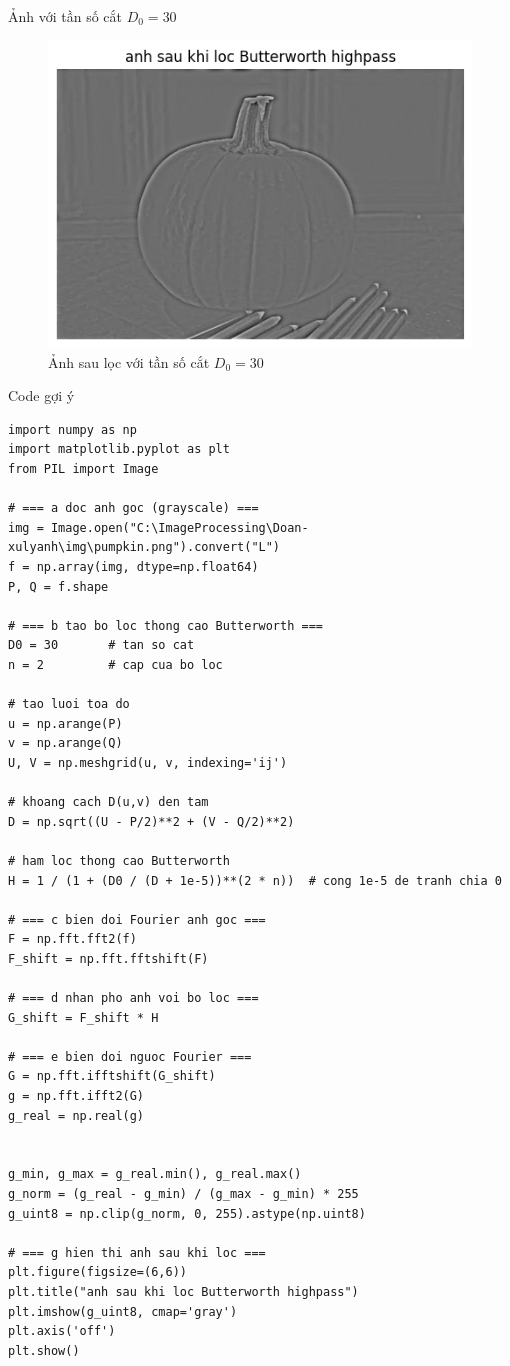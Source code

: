 \documentclass[12pt,a4paper]{report}
\numberwithin{equation}{section}
\theoremstyle{definition} %
\begin{document}
Ảnh với tần số cắt $D_0=30$
\begin{figure}[H]
\centering
\includegraphics[width=0.7\linewidth]{img/butterworthhighpass/anhsaulocHighpass.png}
\caption{Ảnh sau lọc với tần số cắt $D_0=30$}
\label{fig137}
\end{figure}
Code gợi ý
\begin{lstlisting}
import numpy as np
import matplotlib.pyplot as plt
from PIL import Image

# === a doc anh goc (grayscale) ===
img = Image.open("C:\ImageProcessing\Doan-xulyanh\img\pumpkin.png").convert("L")
f = np.array(img, dtype=np.float64)
P, Q = f.shape

# === b tao bo loc thong cao Butterworth ===
D0 = 30       # tan so cat
n = 2         # cap cua bo loc

# tao luoi toa do
u = np.arange(P)
v = np.arange(Q)
U, V = np.meshgrid(u, v, indexing='ij')

# khoang cach D(u,v) den tam
D = np.sqrt((U - P/2)**2 + (V - Q/2)**2)

# ham loc thong cao Butterworth
H = 1 / (1 + (D0 / (D + 1e-5))**(2 * n))  # cong 1e-5 de tranh chia 0

# === c bien doi Fourier anh goc ===
F = np.fft.fft2(f)
F_shift = np.fft.fftshift(F)

# === d nhan pho anh voi bo loc ===
G_shift = F_shift * H

# === e bien doi nguoc Fourier ===
G = np.fft.ifftshift(G_shift)
g = np.fft.ifft2(G)
g_real = np.real(g)


g_min, g_max = g_real.min(), g_real.max()
g_norm = (g_real - g_min) / (g_max - g_min) * 255
g_uint8 = np.clip(g_norm, 0, 255).astype(np.uint8)

# === g hien thi anh sau khi loc ===
plt.figure(figsize=(6,6))
plt.title("anh sau khi loc Butterworth highpass")
plt.imshow(g_uint8, cmap='gray')
plt.axis('off')
plt.show()

\end{lstlisting}
\end{document}
